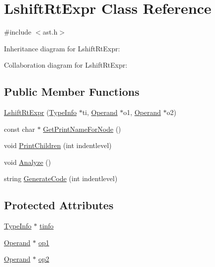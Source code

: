 \hypertarget{class_lshift_rt_expr}{}\section{Lshift\+Rt\+Expr Class Reference}
\label{class_lshift_rt_expr}


{\ttfamily \#include $<$ast.\+h$>$}



Inheritance diagram for Lshift\+Rt\+Expr\+:


Collaboration diagram for Lshift\+Rt\+Expr\+:
\subsection*{Public Member Functions}
\begin{DoxyCompactItemize}
\item 
\hyperlink{class_lshift_rt_expr_af17acaeb2579a3fe851b861f416c9690}{Lshift\+Rt\+Expr} (\hyperlink{class_type_info}{Type\+Info} $\ast$ti, \hyperlink{class_operand}{Operand} $\ast$o1, \hyperlink{class_operand}{Operand} $\ast$o2)
\item 
const char $\ast$ \hyperlink{class_lshift_rt_expr_af70c1654e30718a57ebdb9a85912d9f0}{Get\+Print\+Name\+For\+Node} ()
\item 
void \hyperlink{class_lshift_rt_expr_a009f6d7041743b94598b42b0dfdb8880}{Print\+Children} (int indentlevel)
\item 
void \hyperlink{class_lshift_rt_expr_ae9b2290c259d8d21997f1498d79b4f40}{Analyze} ()
\item 
string \hyperlink{class_lshift_rt_expr_a19a964e6ac37d52a0bb3dbe7fc2f11ad}{Generate\+Code} (int indentlevel)
\end{DoxyCompactItemize}
\subsection*{Protected Attributes}
\begin{DoxyCompactItemize}
\item 
\hyperlink{class_type_info}{Type\+Info} $\ast$ \hyperlink{class_lshift_rt_expr_a7ebf86b2188b80b5ab5e5b63414d6f6f}{tinfo}
\item 
\hyperlink{class_operand}{Operand} $\ast$ \hyperlink{class_lshift_rt_expr_a9432fbd3b143c0b6636c6941da69221f}{op1}
\item 
\hyperlink{class_operand}{Operand} $\ast$ \hyperlink{class_lshift_rt_expr_aa73e269a6813c1acab7446e3bdc794d4}{op2}
\end{DoxyCompactItemize}


